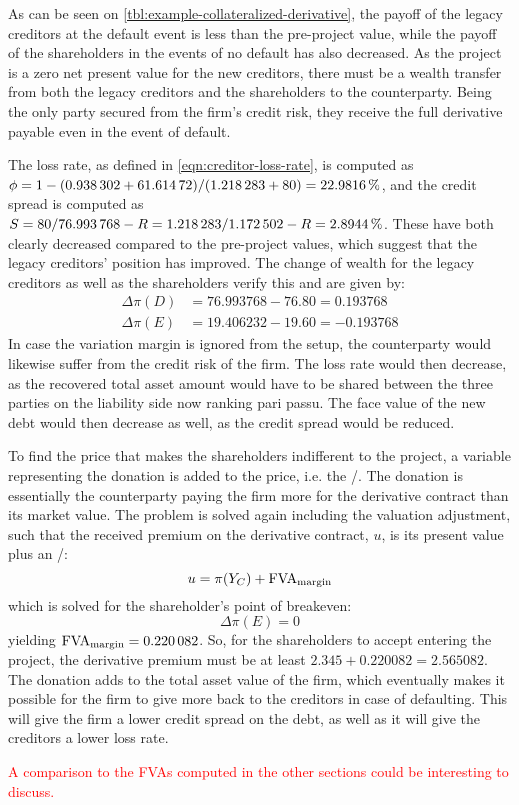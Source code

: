 \documentclass[../main.tex]{subfiles}
\begin{document}
        As can be seen on \cref{tbl:example-collateralized-derivative}, the payoff of the legacy creditors at the default event is less than the pre-project value, while the payoff of the shareholders in the events of no default has also decreased. As the project is a zero net present value for the new creditors, there must be a wealth transfer from both the legacy creditors and the shareholders to the counterparty. Being the only party secured from the firm's credit risk, they receive the full derivative payable even in the event of default.

        The loss rate, as defined in \cref{eqn:creditor-loss-rate}, is computed as
        $\phi = 1-(\num{0.938302}+\num{61.61472})/(\num{1.218283}+\num{80}) = \pct{0.229816}$,
        and the credit spread is computed as
        $S = \num{80}/\num{76.993768} - \grossrfrate = \num{1.218283}/\num{1.172502} - \grossrfrate = \pct{0.028944}$. 
        These have both clearly decreased compared to the pre-project values, which suggest that the legacy creditors' position has improved.
        The change of wealth for the legacy creditors as well as the shareholders verify this and are given by:
        \begin{align}
            \Delta \pi(D) &= \num{76.993768} - \num{76.80} = \num{0.193768}\\
            \Delta \pi(E) &= \num{19.406232} - \num{19.60} = \num{-0.193768}
        \end{align}
        In case the variation margin is ignored from the setup, the counterparty would likewise suffer from the credit risk of the firm.
        The loss rate would then decrease,
        as the recovered total asset amount would have to be shared between the three parties on the liability side now ranking pari passu.
        The face value of the new debt would then decrease as well, as the credit spread would be reduced.

        To find the price that makes the shareholders indifferent to the project,
        a variable representing the donation is added to the price, i.e. the \MVA/.
        The donation is essentially the counterparty paying the firm more for the derivative contract than its market value.
        The problem is solved again including the valuation adjustment,
        such that the received premium on the derivative contract, $u$, is its present value plus an \MVA/:
        \begin{equation}
            u = \pi(Y_C) + \MVA/
        \end{equation}
        which is solved for the shareholder's point of breakeven:
        \begin{equation}
            \Delta \pi(E) = 0
        \end{equation}
        yielding $\MVA/ = \num{0.220082}$. So, for the shareholders to accept entering the project, the derivative premium must be at least $\num{2.345} + \num{0.220082} = \num{2.565082}$.
        The donation adds to the total asset value of the firm,
        which eventually makes it possible for the firm to give more back to the creditors in case of defaulting.
        This will give the firm a lower credit spread on the debt, as well as it will give the creditors a lower loss rate.

        \textcolor{red}{A comparison to the FVAs computed in the other sections could be interesting to discuss.}
        
\end{document}
